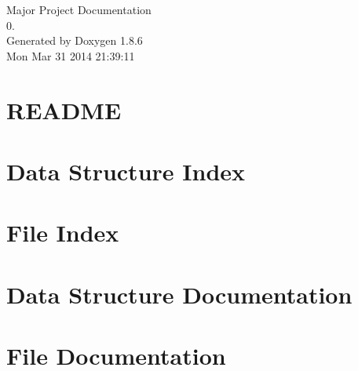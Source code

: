\documentclass[twoside]{book}
\newcommand{\clearemptydoublepage}{%
  \newpage{\pagestyle{empty}\cleardoublepage}%
}
\begin{document}
\begin{titlepage}
\vspace*{7cm}
\begin{center}%
{\Large Major Project Documentation \\[1ex]\large 0. }\\
\vspace*{1cm}
{\large Generated by Doxygen 1.8.6}\\
\vspace*{0.5cm}
{\small Mon Mar 31 2014 21:39:11}\\
\end{center}
\end{titlepage}
\clearemptydoublepage
\tableofcontents
\clearemptydoublepage
{}

\chapter{R\-E\-A\-D\-M\-E}
\label{md__c_1__users__stefan__documents__git_hub__final__project__r_e_a_d_m_e}

\chapter{Data Structure Index}

\chapter{File Index}

\chapter{Data Structure Documentation}

\chapter{File Documentation}































\newpage
{}
{}
\printindex
\end{document}
